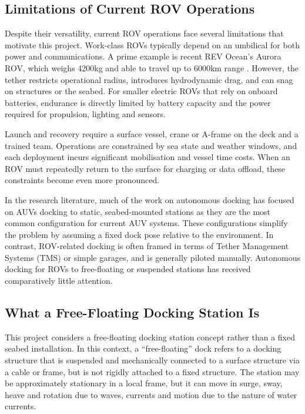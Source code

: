 \subsection{Limitations of Current ROV Operations}

Despite their versatility, current ROV operations face several limitations that motivate this project. Work-class ROVs typically depend on an umbilical for both power and communications. A prime example is recent REV Ocean's Aurora ROV, which weighs 4200kg and able to travel up to 6000km range \cite{REVOcean_2023}. However, the tether restricts operational radius, introduces hydrodynamic drag, and can snag on structures or the seabed. For smaller electric ROVs that rely on onboard batteries, endurance is directly limited by battery capacity and the power required for propulsion, lighting and sensors.

Launch and recovery require a surface vessel, crane or A-frame on the deck and a trained team. Operations are constrained by sea state and weather windows, and each deployment incurs significant mobilisation and vessel time costs. When an ROV must repeatedly return to the surface for charging or data offload, these constraints become even more pronounced.

In the research literature, much of the work on autonomous docking has focused on AUVs docking to static, seabed-mounted stations as they are the most common configuration for current AUV systems. These configurations simplify the problem by assuming a fixed dock pose relative to the environment. In contrast, ROV-related docking is often framed in terms of Tether Management Systems (TMS) or simple garages, and is generally piloted manually. Autonomous docking for ROVs to free-floating or suspended stations has received comparatively little attention.

\subsection{What a Free-Floating Docking Station Is}

This project considers a free-floating docking station concept rather than a fixed seabed installation. In this context, a “free-floating” dock refers to a docking structure that is suspended and mechanically connected to a surface structure via a cable or frame, but is not rigidly attached to a fixed structure. The station may be approximately stationary in a local frame, but it can move in surge, sway, heave and rotation due to waves, currents and motion due to the nature of water currents.

